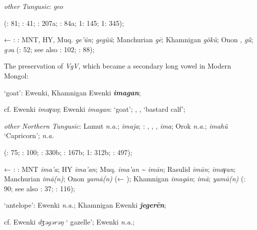 \documentclass[output=paper,colorlinks,citecolor=brown]{langscibook}
\begin{document}
    \textit{other Tungusic}:  \textit{geo} 
    
    (\citealt{Castrén1856}: 81; \citealt{Janhunen1991}: 41; \citealt{Dorji1998}: 207a; \citealt{Vasilevic1958}: 84a; \citealt{Cincius1975B} 1: 145; \citealt{Hauer1952} 1: 345);

    ← : : MNT, HY, Muq. \textit{ge’ün};  \textit{gegüü}; Manchurian  \textit{gē};  Khamnigan \textit{gökü}; Onon ,  \textit{gǖ};  \textit{gǝu} (\citealt{Khabtagaeva2017}: 52; see also \citealt{Doerfer1985}: 102; \citealt{Rozycki1994}: 88);

\z
    \ex The preservation of  \textit{VgV}, which became a secondary long vowel in Modern Mongol:

\ea ‘goat’:  Ewenki, Khamnigan Ewenki \textbf{\textit{imagan}};

    cf.  Ewenki \textit{imaγaŋ};  Ewenki \textit{imagan}:  ‘goat’; , ,  ‘bastard calf’;

    \textit{other Northern Tungusic}: Lamut \textit{n.a.};  \textit{imaja}; \textit{}: , , ,  \textit{ima}; Orok \textit{n.a.};  \textit{imahû} ‘Capricorn’;  \textit{n.a.} 
    
    (\citealt{Castrén1856}: 75; \citealt{Janhunen1991}: 100; \citealt{Dorji1998}: 330b; \citealt{Vasilevic1958}: 167b; \citealt{Cincius1975B} 1: 312b; \citealt{Hauer1952}: 497);

    ← : : MNT \textit{ima’a}; HY \textit{ima’an}; Muq. \textit{ima’an {\textasciitilde} imān}; Rasulid \textit{imān};  \textit{imaγan}; Manchurian  \textit{imā(n)}; Onon  \textit{yamā(n)} (← );  Khamnigan \textit{imagān};  \textit{imā};  \textit{yamā(n)} (\citealt{Khabtagaeva2017}: 90; see also \citealt{Doerfer1985}: 37;  \citealt{Rozycki1994}: 116);

    \ex ‘antelope’:  Ewenki \textit{n.a.}; Khamnigan Ewenki \textbf{\textit{ǰegerēn}};

    cf.  Ewenki \textit{dʒǝgǝrǝŋ} ‘ gazelle’;  Ewenki \textit{n.a.};
\end{document}
